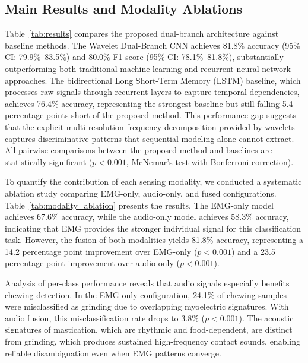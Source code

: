 \documentclass[pdflatex,sn-vancouver-num, iicol]{sn-jnl}
\begin{document}
\subsection{Main Results and Modality Ablations}

Table~\ref{tab:results} compares the proposed dual-branch architecture against baseline methods. The Wavelet Dual-Branch CNN achieves 81.8\% accuracy (95\% CI: 79.9\%--83.5\%) and 80.0\% F1-score (95\% CI: 78.1\%--81.8\%), substantially outperforming both traditional machine learning and recurrent neural network approaches. The bidirectional Long Short-Term Memory (LSTM) baseline, which processes raw signals through recurrent layers to capture temporal dependencies, achieves 76.4\% accuracy, representing the strongest baseline but still falling 5.4 percentage points short of the proposed method. This performance gap suggests that the explicit multi-resolution frequency decomposition provided by wavelets captures discriminative patterns that sequential modeling alone cannot extract. All pairwise comparisons between the proposed method and baselines are statistically significant ($p < 0.001$, McNemar's test with Bonferroni correction).


To quantify the contribution of each sensing modality, we conducted a systematic ablation study comparing EMG-only, audio-only, and fused configurations. Table~\ref{tab:modality_ablation} presents the results. The EMG-only model achieves 67.6\% accuracy, while the audio-only model achieves 58.3\% accuracy, indicating that EMG provides the stronger individual signal for this classification task. However, the fusion of both modalities yields 81.8\% accuracy, representing a 14.2 percentage point improvement over EMG-only ($p < 0.001$) and a 23.5 percentage point improvement over audio-only ($p < 0.001$).

Analysis of per-class performance reveals that audio signals especially benefits chewing detection. In the EMG-only configuration, 24.1\% of chewing samples were misclassified as grinding due to overlapping myoelectric signatures. With audio fusion, this misclassification rate drops to 3.8\% ($p < 0.001$). The acoustic signatures of mastication, which are rhythmic and food-dependent, are distinct from grinding, which produces sustained high-frequency contact sounds, enabling reliable disambiguation even when EMG patterns converge.
\end{document}
